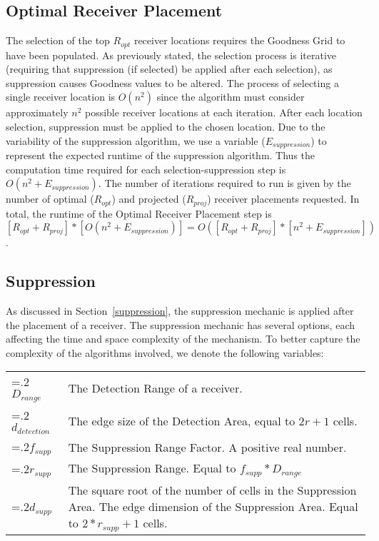 \subsection{Optimal Receiver Placement}
The selection of the top $R_{opt}$ receiver locations requires the Goodness Grid to have been populated.  As previously stated, the selection process is iterative (requiring that suppression (if selected) be applied after each selection), as suppression causes Goodness values to be altered.  The process of selecting a single receiver location is $O(n^2)$ since the algorithm must consider approximately $n^2$ possible receiver locations at each iteration.  After each location selection, suppression must be applied to the chosen location.  Due to the variability of the suppression algorithm, we use a variable  ($E_{suppression}$) to represent the expected runtime of the suppression algorithm.  Thus the computation time required for each selection-suppression step is $O(n^2 + E_{suppression})$.  The number of iterations required to run is given by the number of optimal ($R_{opt}$) and projected ($R_{proj}$) receiver placements requested.  In total, the runtime of the Optimal Receiver Placement step is $[R_{opt} + R_{proj}] * [O(n^2 + E_{suppression})] = O([R_{opt} + R_{proj}]* [n^2 + E_{suppression}])$.


\subsection{Suppression}
As discussed in Section~\ref{suppression}, the suppression mechanic is applied after the placement of a receiver.  The suppression mechanic has several options, each affecting the time and space complexity of the mechanism.  To better capture the complexity of the algorithms involved, we denote the following variables: \newline

\noindent\begin{tabularx}{\linewidth}{@{}>{\hsize=.2\hsize}X>{\hsize=1.5\hsize}X@{}}
	
$D_{range}$& The Detection Range of a receiver.\\
$d_{detection}$& The edge size of the Detection Area, equal to $2r+1$ cells.\\
$f_{supp}$ & The Suppression Range Factor.  A positive real number.\\
$r_{supp}$ & The Suppression Range. Equal to $f_{supp}*D_{range}$\\
$d_{supp}$ & The square root of the number of cells in the Suppression Area.  The edge dimension of the Suppression Area.  Equal to $2*r_{supp} + 1$ cells.\\
\end{tabularx}
